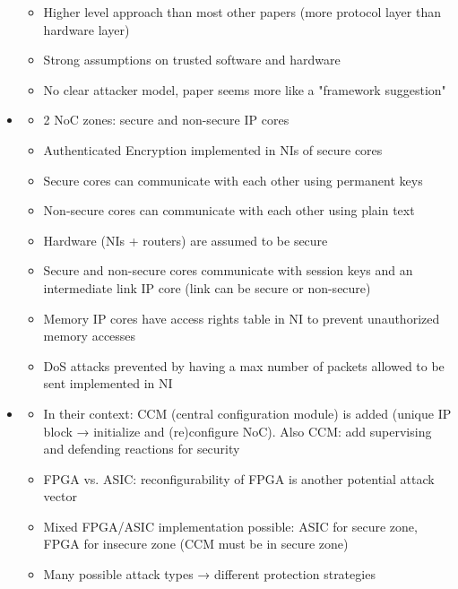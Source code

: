 \documentclass[
	paper=a4,
	fontsize=11pt,
	parskip=full %
]{scrreprt}
\begin{document}
\begin{itemize}
\begin{itemize}
\begin{itemize}
                    \end{itemize}
                \item Higher level approach than most other papers (more protocol layer than hardware layer)
                \item Strong assumptions on trusted software and hardware
                \item No clear attacker model, paper seems more like a "framework suggestion"
            \end{itemize}
        \item \textbf{}
            \begin{itemize}
                \item 2 NoC zones: secure and non-secure IP cores
                \item Authenticated Encryption implemented in NIs of secure cores
                \item Secure cores can communicate with each other using permanent keys
                \item Non-secure cores can communicate with each other using plain text
                \item Hardware (NIs + routers) are assumed to be secure
                \item Secure and non-secure cores communicate with session keys and an intermediate link IP core (link can be secure or non-secure)
                \item Memory IP cores have access rights table in NI to prevent unauthorized memory accesses
                \item DoS attacks prevented by having a max number of packets allowed to be sent implemented in NI
            \end{itemize}
        \item \textbf{}
            \begin{itemize}
                \item In their context: CCM (central configuration module) is added (unique IP block → initialize and (re)configure NoC). Also CCM:
                    add supervising and defending reactions for security
                \item FPGA vs. ASIC: reconfigurability of FPGA is another potential attack vector
                \item Mixed FPGA/ASIC implementation possible: ASIC for secure zone, FPGA for insecure zone (CCM must be in secure zone)
                \item Many possible attack types → different protection strategies

\end{itemize}
\end{itemize}
\end{document}
